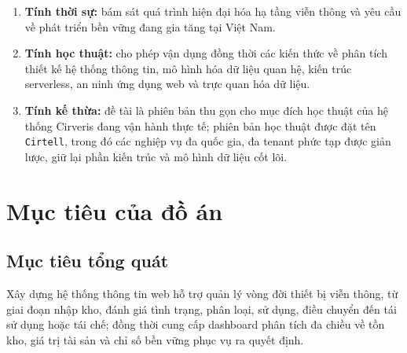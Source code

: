 \begin{enumerate}[leftmargin=1.2cm]
    \item \textbf{Tính thời sự:} bám sát quá trình hiện đại hóa hạ tầng viễn thông và yêu cầu về phát triển bền vững đang gia tăng tại Việt Nam.
    \item \textbf{Tính học thuật:} cho phép vận dụng đồng thời các kiến thức về phân tích thiết kế hệ thống thông tin, mô hình hóa dữ liệu quan hệ, kiến trúc serverless, an ninh ứng dụng web và trực quan hóa dữ liệu.
    \item \textbf{Tính kế thừa:} đề tài là phiên bản thu gọn cho mục đích học thuật của hệ thống Cirveris đang vận hành thực tế; phiên bản học thuật được đặt tên \texttt{Cirtell}, trong đó các nghiệp vụ đa quốc gia, đa tenant phức tạp được giản lược, giữ lại phần kiến trúc và mô hình dữ liệu cốt lõi.
\end{enumerate}

\section{Mục tiêu của đồ án}
\label{sec:muctieu}

\subsection{Mục tiêu tổng quát}
Xây dựng hệ thống thông tin web hỗ trợ quản lý vòng đời thiết bị viễn thông, từ giai đoạn nhập kho, đánh giá tình trạng, phân loại, sử dụng, điều chuyển đến tái sử dụng hoặc tái chế; đồng thời cung cấp dashboard phân tích đa chiều về tồn kho, giá trị tài sản và chỉ số bền vững phục vụ ra quyết định.

